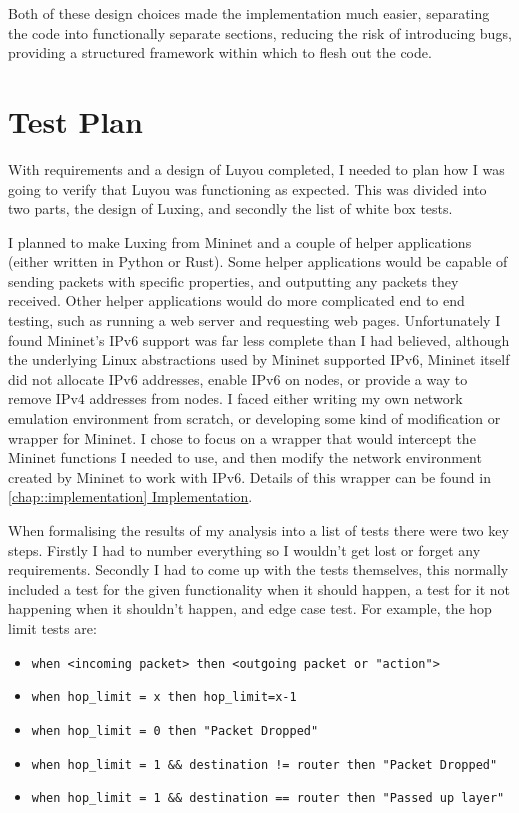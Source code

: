 \documentclass[12pt,a4paper,twoside,openright]{report}
\begin{document}
\bigskip

Both of these design choices made the implementation much easier, separating the code into functionally separate sections, reducing the risk of introducing bugs, providing a structured framework within which to flesh out the code.

\section{Test Plan}
\label{sec:test_plan}

With requirements and a design of Luyou completed, I needed to plan how I was going to verify that Luyou was functioning as expected.  This was divided into two parts, the design of Luxing, and secondly the list of white box tests.

\bigskip

I planned to make Luxing from Mininet and a couple of helper applications (either written in Python or Rust).  Some helper applications would be capable of sending packets with specific properties, and outputting any packets they received. Other helper applications would do more complicated end to end testing, such as running a web server and requesting web pages.  Unfortunately I found Mininet's IPv6 support was far less complete than I had believed, although the underlying Linux abstractions used by Mininet supported IPv6, Mininet itself did not allocate IPv6 addresses, enable IPv6 on nodes, or provide a way to remove IPv4 addresses from nodes.  I faced either writing my own network emulation environment from scratch, or developing some kind of modification or wrapper for Mininet.  I chose to focus on a wrapper that would intercept the Mininet functions I needed to use, and then modify the network environment created by Mininet to work with IPv6. Details of this wrapper can be found in \ref{chap::implementation}\hyperref[chap::implementation]{ Implementation}.

\bigskip

When formalising the results of my analysis into a list of tests there were two key steps. Firstly I had to number everything so I wouldn't get lost or forget any requirements.  Secondly I had to come up with the tests themselves, this normally included a test for the given functionality when it should happen, a test for it not happening when it shouldn't happen, and edge case test.  For example, the hop limit tests are:
\begin{itemize}
\item \verb!when <incoming packet> then <outgoing packet or "action">!
\item \verb!when hop_limit = x then hop_limit=x-1!
\item \verb!when hop_limit = 0 then "Packet Dropped"!
\item \verb+when hop_limit = 1 && destination != router then "Packet Dropped" +
\item \verb!when hop_limit = 1 && destination == router then "Passed up layer"!
\end{itemize}
\end{document}

